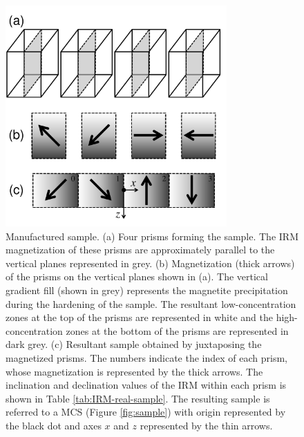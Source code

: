 \documentclass[draft,gc]{agutex}
\begin{document}
 \begin{figure}
 \noindent \includegraphics[width=20pc]{Figs/Fig13_HQ.pdf}
 \caption{Manufactured sample. 
 (a) Four prisms forming the sample. The IRM magnetization of these
 prisms are approximately parallel to the vertical planes represented
 in grey.
 (b) Magnetization (thick arrows) of the prisms on the vertical 
 planes shown in (a). The vertical gradient fill (shown in grey)
 represents the magnetite precipitation during the hardening of
 the sample. The resultant low-concentration zones at the top of
 the prisms are represented in white and the high-concentration zones
 at the bottom of the prisms are represented in dark grey.
 (c) Resultant sample obtained by juxtaposing the magnetized prisms.
 The numbers indicate the index of each prism, whose magnetization
 is represented by the thick arrows. The inclination and declination
 values of the IRM within each prism is shown in Table 
 \ref{tab:IRM-real-sample}.
 The resulting sample is referred to a MCS (Figure \ref{fig:sample}) 
 with origin represented by the black dot and axes $x$ and $z$ 
 represented by the thin arrows.}
 \label{fig:real-sample}
 \end{figure}
\end{document}
